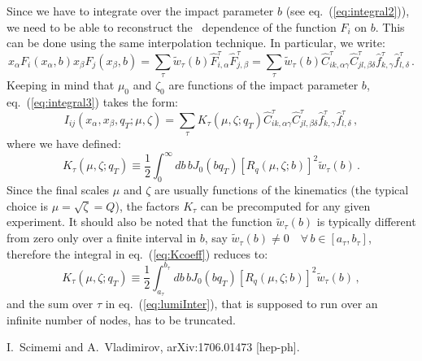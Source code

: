 \documentclass[10pt,a4paper]{article}
\begin{document}
Since we have to integrate over the impact parameter $b$ (see
eq.~(\ref{eq:integral2})), we need to be able to reconstruct the \
dependence of the function $F_i$ on $b$. This can be done using the
same interpolation technique. In particular, we write:
\begin{equation}
  x_\alpha F_i(x_{\alpha},b)
  x_\beta F_j(x_\beta,b) = \sum_\tau
  \widetilde{w}_{\tau}(b) \hat{F}_{i,\alpha}^\tau \hat{F}_{j,\beta}^\tau
  = \sum_\tau \widetilde{w}_{\tau}(b) \hat{C}_{ik,\alpha\gamma}^\tau
  \hat{C}_{jl,\beta\delta}^\tau \hat{f}_{k,\gamma}^\tau \hat{f}_{l,\delta}^\tau\,.
\end{equation}
Keeping in mind that $\mu_0$ and $\zeta_0$ are functions of the impact
parameter $b$, eq.~(\ref{eq:integral3}) takes the form:
\begin{equation}\label{eq:lumiInter}
I_{ij}(x_\alpha,x_\beta,q_T;\mu,\zeta)=\sum_\tau K_\tau(\mu,\zeta;q_T)\hat{C}_{ik,\alpha\gamma}^\tau
\hat{C}_{jl,\beta\delta}^\tau \hat{f}_{k,\gamma}^\tau \hat{f}_{l,\delta}^\tau\,,
\end{equation}
where we have defined:
\begin{equation}\label{eq:Kcoeff}
  K_\tau(\mu,\zeta;q_T)\equiv\frac12\int_0^\infty db\,b J_0(bq_T)
  \left[R_q(\mu,\zeta;b)\right]^2 \widetilde{w}_{\tau}(b)\,.
\end{equation}
Since the final scales $\mu$ and $\zeta$ are usually functions of the
kinematics (the typical choice is $\mu=\sqrt{\zeta}=Q$), the factors
$K_\tau$ can be precomputed for any given experiment. It should also
be noted that the function $\widetilde{w}_{\tau}(b)$ is typically
different from zero only over a finite interval in $b$, say
$\widetilde{w}_{\tau}(b)\neq 0\quad\forall\,b \in[a_\tau,b_\tau]$,
therefore the integral in eq.~(\ref{eq:Kcoeff}) reduces to:
\begin{equation}\label{eq:Kcoeff1}
  K_\tau(\mu,\zeta;q_T)\equiv\frac12\int_{a_\tau}^{b_\tau} db\,b J_0(bq_T)
  \left[R_q(\mu,\zeta;b)\right]^2 \widetilde{w}_{\tau}(b)\,,
\end{equation}
and the sum over $\tau$ in eq.~(\ref{eq:lumiInter}), that is supposed
to run over an infinite number of nodes, has to be truncated.



\begin{thebibliography}{alp}

  I.~Scimemi and A.~Vladimirov,
  arXiv:1706.01473 [hep-ph].

\end{thebibliography}
\end{document}
